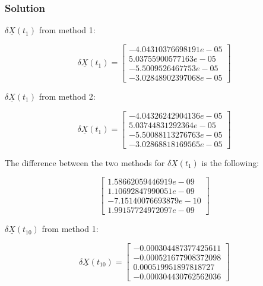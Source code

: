 \documentclass[conf]{new-aiaa}
\begin{document}

\subsubsection*{Solution} 

$\delta \underline{X}(t_1)$ from method 1: 

\begin{equation}
	\delta \underline{X}(t_1) = 
	\begin{bmatrix}
		-4.04310376698191e-05 \\
		5.03755900577163e-05 \\
		-5.5009526467753e-05 \\
		-3.02848902397068e-05 		
	\end{bmatrix}
\end{equation}

$\delta \underline{X}(t_1)$ from method 2: 

\begin{equation}
	\delta \underline{X}(t_1) = 
	\begin{bmatrix}
		-4.04326242904136e-05 \\
		5.03744831292364e-05 \\
		-5.50088113276763e-05 \\
		-3.02868818169565e-05
	\end{bmatrix}
\end{equation}

The difference between the two methods for $\delta \underline{X}(t_1)$ is the following: 

\begin{equation}
	\begin{bmatrix}
		1.58662059446919e-09 \\
		1.10692847990051e-09 \\
		-7.15140076693879e-10 \\
		1.99157724972097e-09
	\end{bmatrix}
\end{equation}

$\delta \underline{X}(t_{10})$ from method 1: 

\begin{equation}
\delta \underline{X}(t_{10}) = 
\begin{bmatrix}
     -0.000304487377425611 \\
	-0.000521677908372098 \\
	0.000519951897818727 \\
	-0.000304430762562036
\end{bmatrix}
\end{equation}
\end{document}
